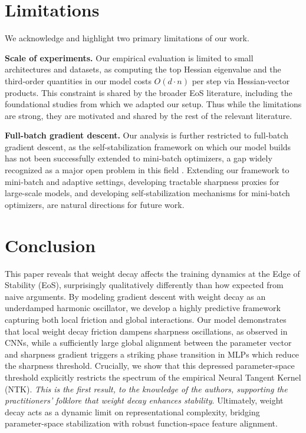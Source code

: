 \documentclass{article}
\begin{document}
\section{Limitations}
\label{sec:limitations}

We acknowledge and highlight two primary limitations of our work.

\textbf{Scale of experiments.} Our empirical evaluation is limited to small architectures and datasets, as computing the top Hessian eigenvalue and the third-order quantities in our model costs $O(d \cdot n)$ per step via Hessian-vector products. This constraint is shared by the broader EoS literature, including the foundational studies \cite{cohen, andreyev_beneventano} from which we adapted our setup. Thus while the limitations are strong, they are motivated and shared by the rest of the relevant literature.

\textbf{Full-batch gradient descent.} Our analysis is further restricted to full-batch gradient descent, as the self-stabilization framework \cite{damian_selfstab} on which our model builds has not been successfully extended to mini-batch optimizers, a gap widely recognized as a major open problem in this field \cite{andreyev_beneventano, damian_selfstab}. Extending our framework to mini-batch and adaptive settings, developing tractable sharpness proxies for large-scale models, and developing self-stabilization mechanisms for mini-batch optimizers, are natural directions for future work.


\section{Conclusion}

This paper reveals that weight decay affects the training dynamics at the Edge of Stability (EoS), surprisingly qualitatively differently than how expected from naive arguments. By modeling gradient descent with weight decay as an underdamped harmonic oscillator, we develop a highly predictive framework capturing both local friction and global interactions. Our model demonstrates that local weight decay friction dampens sharpness oscillations, as observed in CNNs, while a sufficiently large global alignment between the parameter vector and sharpness gradient triggers a striking phase transition in MLPs which reduce the sharpness threshold. Crucially, we show that this depressed parameter-space threshold explicitly restricts the spectrum of the empirical Neural Tangent Kernel (NTK). \textit{This is the first result, to the knowledge of the authors, supporting the practitioners' folklore that weight decay enhances stability}. Ultimately, weight decay acts as a dynamic limit on representational complexity, bridging parameter-space stabilization with robust function-space feature alignment.
\end{document}
